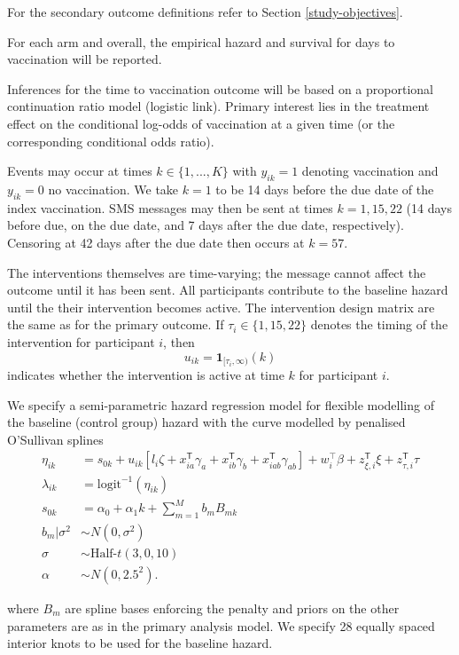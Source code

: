 \documentclass[
  bibliography=totoc]{scrreprt}
\begin{document}
For the secondary outcome definitions refer to Section \ref{study-objectives}.

For each arm and overall, the empirical hazard and survival for days to vaccination will be reported.

Inferences for the time to vaccination outcome will be based on a proportional continuation ratio model (logistic link).
Primary interest lies in the treatment effect on the conditional log-odds of vaccination at a given time (or the corresponding conditional odds ratio).

Events may occur at times \(k\in\{1,...,K\}\) with \(y_{ik}=1\) denoting vaccination and \(y_{ik}=0\) no vaccination.
We take \(k=1\) to be 14 days before the due date of the index vaccination.
SMS messages may then be sent at times \(k=1, 15, 22\) (14 days before due, on the due date, and 7 days after the due date, respectively).
Censoring at 42 days after the due date then occurs at \(k=57\).

The interventions themselves are time-varying; the message cannot affect the outcome until it has been sent.
All participants contribute to the baseline hazard until the their intervention becomes active.
The intervention design matrix are the same as for the primary outcome.
If \(\tau_i\in\{1,15,22\}\) denotes the timing of the intervention for participant \(i\), then
\[
u_{ik} = \mathbf{1}_{[\tau_i, \infty)}(k)
\]
indicates whether the intervention is active at time \(k\) for participant \(i\).

We specify a semi-parametric hazard regression model for flexible modelling of the baseline (control group) hazard with the curve modelled by penalised O'Sullivan splines \citep{eilers1996, currie2002, wand2008}
\[
\begin{aligned}
\eta_{ik} &= s_{0k} + u_{ik}\left[l_i\zeta +  x_{ia}^\mathsf{T}\gamma_a + x_{ib}^\mathsf{T}\gamma_b + x_{iab}^\mathsf{T}\gamma_{ab} \right] + w_i^\top\beta + z^\mathsf{T}_{\xi,i}\xi + z^\mathsf{T}_{\tau,i}\tau \\
\lambda_{ik} &= \text{logit}^{-1}(\eta_{ik}) \\
s_{0k} &= \alpha_{0} + \alpha_{1} k + \textstyle\sum_{m=1}^M b_{m} B_{mk} \\
b_m|\sigma^2 &\sim N(0,\sigma^2) \\
\sigma &\sim \text{Half-}t(3, 0, 10) \\
\alpha &\sim N(0,2.5^2).
\end{aligned}
\]

where \(B_m\) are spline bases enforcing the penalty and priors on the other parameters are as in the primary analysis model.
We specify 28 equally spaced interior knots to be used for the baseline hazard.
\end{document}
